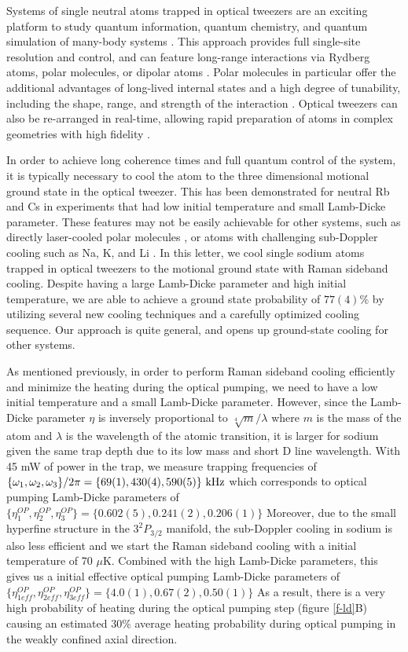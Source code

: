 \documentclass[aps,prl,twocolumn,groupedaddress]{revtex4-1}
\begin{document}
Systems of single neutral atoms trapped in optical tweezers are an exciting platform to study quantum information, quantum chemistry,
and quantum simulation of many-body systems .
This approach provides full single-site resolution and control, and can feature long-range interactions via Rydberg atoms, polar molecules, or dipolar atoms .
Polar molecules in particular offer the additional advantages of long-lived internal states
and a high degree of tunability, including the shape, range,
and strength of the interaction .
Optical tweezers can also be re-arranged in real-time, allowing rapid preparation of atoms in complex geometries with high fidelity .

In order to achieve long coherence times and full quantum control of the system,
it is typically necessary to cool the atom to the
three dimensional motional ground state in the optical tweezer.
This has been demonstrated for neutral Rb\cite{Thompson2013,Kaufman2012} and Cs\cite{Liu2017} in experiments that had low initial temperature and small Lamb-Dicke parameter.
These features
may not be easily achievable for other systems, such as directly laser-cooled polar molecules ,
or atoms with challenging sub-Doppler cooling such as Na, K, and Li .
In this letter, we cool single sodium atoms
trapped in optical tweezers to the motional ground state with Raman sideband cooling.
Despite having a large Lamb-Dicke parameter and high initial temperature, we are able to achieve a ground state probability of $77(4)\%$
by utilizing several new cooling techniques and a carefully optimized cooling sequence.
Our approach is quite general, and opens up ground-state cooling for other systems.

As mentioned previously, in order to perform Raman sideband cooling efficiently and
minimize the heating during the optical pumping, we need to have a low initial temperature and
a small Lamb-Dicke parameter. However, since the Lamb-Dicke parameter $\eta$ is inversely
proportional to $\sqrt[4]{m}/\lambda$ where $m$ is the mass of the atom and $\lambda$
is the wavelength of the atomic transition,
it is larger for sodium given the same trap depth due to its low mass and short D line wavelength.
With 45 mW of power in the trap, we measure trapping frequencies of
$\{\omega_1,\omega_2,\omega_3\}/2\pi = \{69(1), 430(4), 590(5)\}\ \text{\text{kHz}}$
which corresponds to optical pumping Lamb-Dicke parameters of
$\{\eta^{OP}_1,\eta^{OP}_2,\eta^{OP}_3\} = \{0.602(5), 0.241(2), 0.206(1)\}$
Moreover, due to the small hyperfine structure in the $3^2P_{3/2}$ manifold,
the sub-Doppler cooling in sodium is also less efficient and we start the
Raman sideband cooling with a initial temperature of 70 $\mu$K. Combined with the high Lamb-Dicke
parameters, this gives us a initial effective optical pumping Lamb-Dicke parameters of
$\{\eta^{OP}_{1eff},\eta^{OP}_{2eff},\eta^{OP}_{3eff}\} = \{4.0(1), 0.67(2), 0.50(1)\}$
As a result, there is a very high probability of heating during the optical pumping step
(figure \ref{f-ld}B) causing an estimated $30\%$ average heating probability during optical pumping
in the weakly confined axial direction.
\end{document}
